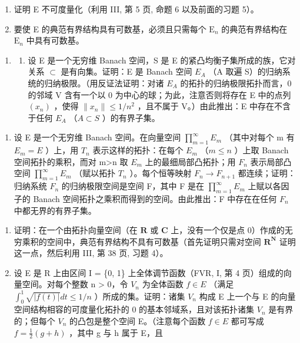 \begin{enumerate}
\def\labelenumi{\alph{enumi})}
\tightlist
\item
  证明 E 不可度量化（利用 III, 第 5 页, 命题 6 以及前面的习题 5）。\\
\item
  要使 E 的典范有界结构具有可数基，必须且只需每个 \(\mathrm{E}_n\) 的典范有界结构在 \(\mathrm{E}_n\) 中具有可数基。
\end{enumerate}

\begin{enumerate}
\def\labelenumi{\arabic{enumi})}
\setcounter{enumi}{6}
\tightlist
\item
  \begin{enumerate}
  \def\labelenumii{\alph{enumii})}
  \tightlist
  \item
    设 E 是一个无穷维 Banach 空间，S 是 E 的紧凸均衡子集所成的族，它对关系 \(\subset\) 是有向集。证明：E 是 Banach 空间 \(E_{A}\) （A 取遍 S）的归纳系统的归纳极限。（用反证法证明：对诸 \(E_{A}\) 的拓扑的归纳极限拓扑而言，0 的邻域 V 含有一个以 0 为中心的球；为此，注意否则将存在 E 中的点列 \((x_{n})\) ，使得 \(\|x_{n}\| \leqslant 1/n^{2}\) ，且不属于 V。）由此推出：E 中存在不含于任何 \(E_{A}\) （\(A \subset S\) ）的有界子集。
  \end{enumerate}
\end{enumerate}

\begin{enumerate}
\def\labelenumi{\alph{enumi})}
\setcounter{enumi}{1}
\tightlist
\item
  设 E 是一个无穷维 Banach 空间。在向量空间 \(\prod_{m=1}^{\infty}E_{m}\) （其中对每个 m 有 \(E_{m}=E\) ）上，用 \(T_{n}\) 表示这样的拓扑：在每个 \(E_{m}\) （\(m\leqslant n\) ）上取 Banach 空间拓扑的乘积，而对 m\textgreater n 取 \(E_{m}\) 上的最细局部凸拓扑；用 \(F_{n}\) 表示局部凸空间 \(\prod_{m=1}^{\infty}E_{m}\) （赋以拓扑 \(T_{n}\) ）。每个恒等映射 \(F_{n}\to F_{n+1}\) 都连续；证明：归纳系统 \(F_{n}\) 的归纳极限空间是空间 F，其中 F 是在 \(\prod_{m=1}^{\infty}E_{m}\) 上赋以各因子的 Banach 空间拓扑之乘积而得到的空间。由此推出：F 中存在在任何 \(F_{n}\) 中都无界的有界子集。
\end{enumerate}

\begin{enumerate}
\def\labelenumi{\arabic{enumi})}
\setcounter{enumi}{7}
\item
  证明：在一个由拓扑向量空间（在 \(\mathbf{R}\) 或 \(\mathbf{C}\) 上，没有一个仅是点 0）作成的无穷乘积的空间中，典范有界结构不具有可数基（首先证明只需对空间 \(\mathbf{R}^{\mathbf{N}}\) 证明这一点，然后利用 III, 第 38 页, 习题 4）。
\item
  设 E 是 R 上由区间 I = \{0, 1\} 上全体调节函数（FVR, I, 第 4 页）组成的向量空间。对每个整数 n \textgreater{} 0，令 \(V_{n}\) 为全体函数 \(f \in E\) （满足 \(\int_{0}^{1} \sqrt{|f(t)|} dt \leqslant 1/n\) ）所成的集。证明：诸集 \(V_{n}\) 构成 E 上一个与 E 的向量空间结构相容的可度量化拓扑的 0 的基本邻域系，且对该拓扑诸集 \(V_{n}\) 是有界的；但每个 \(V_{n}\) 的凸包是整个空间 E。（注意每个函数 \(f \in E\) 都可写成 \(f = \frac{1}{2}(g + h)\) ，其中 g 与 h 属于 E，且
\end{enumerate}

